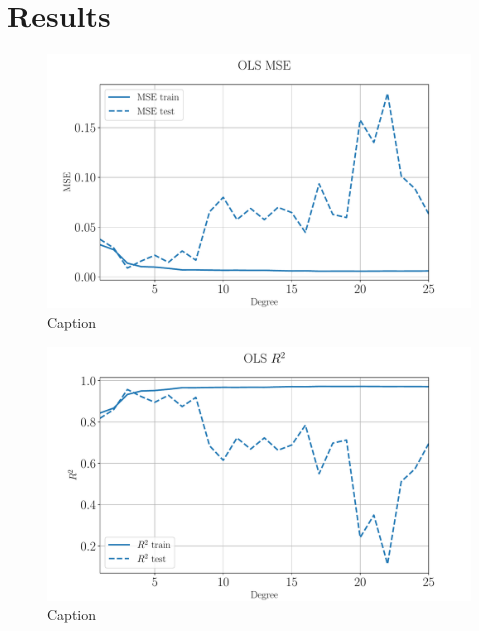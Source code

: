 \documentclass[%
reprint,
amsmath,amssymb,
aps,
pra,
]{revtex4-2}
\begin{document}


\section{Results}
\begin{figure}[ht!]
	\centering
	\includegraphics[width=\linewidth]{Python/Figures/OLS/OLS_MSEno_scaling.pdf}
	\caption{Caption}
	\label{fig:OLS_mse_degree}
\end{figure}
\begin{figure}[ht!]
	\centering
	\includegraphics[width=\linewidth]{Python/Figures/OLS/OLS_R2no_scaling.pdf}
	\caption{Caption}
	\label{fig:OLS_r2_degree}
\end{figure}
\end{document}
